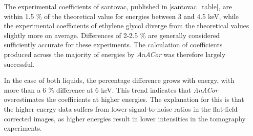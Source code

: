 \begin{table}[h]
\caption{Experimentally calculated ethylene glycol absorption coefficients from \textit{AnACor}. Attenuation length calculated based on chemical formula  and density 1.1132
\unit{\gram\per\cubic\cm} on the Center for X-Ray Optics \href{https://henke.lbl.gov/optical_constants/atten2.html}{X-ray Attenuation Length} platform.}
\label{ethylene_table}
\end{table}

The experimental coefficients of santovac, published in \cref{santovac_table}, are within 1.5 \% of the theoretical value for energies between 3 and 4.5 \unit{keV}, while the experimental coefficients of ethylene glycol diverge from the theoretical values slightly more on average. Differences of 2-2.5 \% are generally considered sufficiently accurate for these experiments. The calculation of coefficients produced across the majority of energies by \textit{AnACor} was therefore largely successful.

In the case of both liquids, the percentage difference grows with energy, with more than a 6 \% difference at 6 \unit{keV}. %
This trend indicates that \textit{AnACor} overestimates the coefficients at higher energies. The explanation for this is that the higher energy data suffers from lower signal-to-noise ratios in the flat-field corrected images, as higher energies result in lower intensities in the tomography experiments.

